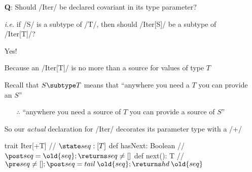 \documentclass{ip3}
\begin{document}
\begin{foil}[Covariance]
\begin{itemize}
\item[\textbf{Q}:] Should \sc/Iter/ be declared covariant in its type parameter?
\item[] \textit{i.e.} if \sc/S/ is a subtype of \sc/T/, then should  \sc/Iter[S]/ be a subtype of \sc/Iter[T]/?

\vitem[\textbf{A}:] Yes! 
\item[] Because an \sc/Iter[T]/ is no more than a source for values of type $T$ 
\item[] Recall that  $S\subtype T$ means that ``anywhere you need a $T$ you can provide an $S$''
\begin{itemize}
        \item[] $\therefore$ ``anywhere you need a source of $T$ you can provide a source of $S$''
\end{itemize}

\vitem So our \textit{actual} declaration for \sc/Iter/ decorates its parameter type with a \sc/+/
\begin{scala}
                trait Iter[+T] {         // $\state seq: [T]$
                 def hasNext: Boolean    // $\post seq=\old{seq}; \returns seq\not=[]$
                 def next():  T          // $\pre seq\not=[]; \post seq=tail\:\old{seq}; \returns hd\:\old{seq}$
                }
\end{scala}
\end{itemize}
\end{foil}
\end{document}
